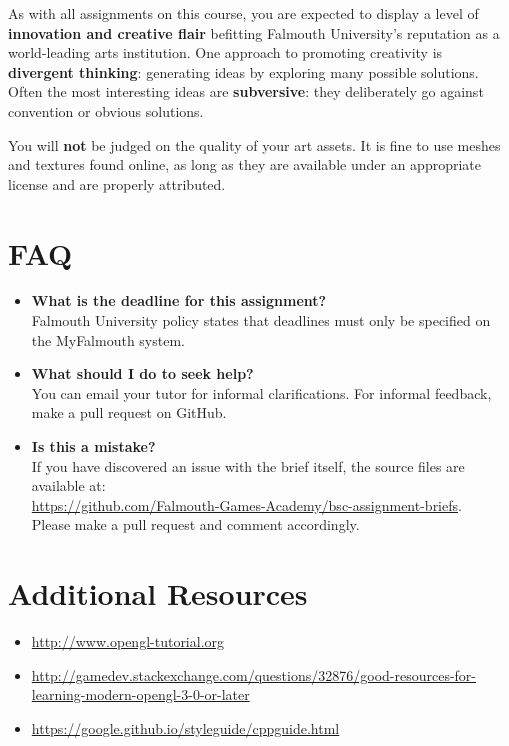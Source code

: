 \documentclass{../../fal_assignment}
\begin{document}
As with all assignments on this course, you are expected to display a level of
\textbf{innovation and creative flair} befitting Falmouth University's reputation as a world-leading
arts institution.
One approach to promoting creativity is
\textbf{divergent thinking}: generating ideas by exploring many possible solutions.
Often the most interesting ideas are \textbf{subversive}: they deliberately go against
convention or obvious solutions.

You will \textbf{not} be judged on the quality of your art assets.
It is fine to use meshes and textures found online,
as long as they are available under an appropriate license and are properly attributed.

\section*{FAQ}

\begin{itemize}
	\item 	\textbf{What is the deadline for this assignment?} \\ 
    		Falmouth University policy states that deadlines must only be specified on the MyFalmouth system.
    		
	\item 	\textbf{What should I do to seek help?} \\ 
    		You can email your tutor for informal clarifications. For informal feedback, make a pull request on GitHub. 
    		
    	\item 	\textbf{Is this a mistake?} \\ 	
    		If you have discovered an issue with the brief itself, the source files are available at: \\
    		\url{https://github.com/Falmouth-Games-Academy/bsc-assignment-briefs}.\\
    		 Please make a pull request and comment accordingly.
\end{itemize}

\section*{Additional Resources}

\begin{itemize}
    \item \url{http://www.opengl-tutorial.org}
    \item \url{http://gamedev.stackexchange.com/questions/32876/good-resources-for-learning-modern-opengl-3-0-or-later}
    \item \url{https://google.github.io/styleguide/cppguide.html}
\end{itemize}
\end{document}
